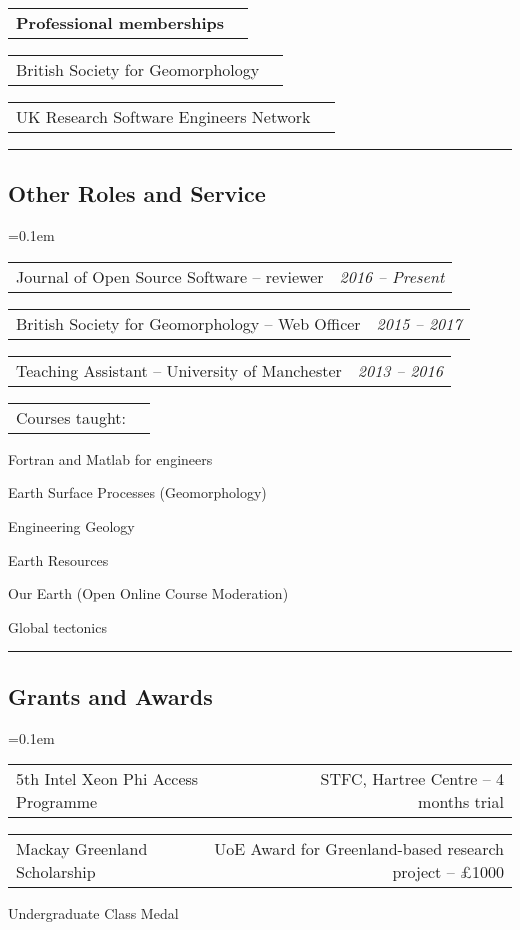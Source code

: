 \documentclass[10.5pt,a4]{article}
\makeatletter
\newenvironment{indentsection}[1]%
{\begin{list}{}%
	{\setlength{\leftmargin}{#1}}%
	\item[]%
}
{\end{list}}
\newcommand{\headerrow}[2]
{\begin{tabular*}{\linewidth}{l@{\extracolsep{\fill}}r}
	#1 &
	#2 \\
\end{tabular*}}
\makeatother
\begin{document}
\begin{itemize*}
	\item 
	\headerrow
		{\textbf{Professional memberships}}
		{}
	\headerrow {British Society for Geomorphology}{}
	\headerrow {UK Research Software Engineers Network}{}

\end{itemize*}

\hrule
\vspace{-0.4em}
\subsection*{Other Roles and Service} 
	\parskip=0.1em
\begin{itemize*}
	\item
	\headerrow
		 {Journal of Open Source Software -- reviewer}
		 {\textit{2016 -- Present}}
	\item 
	\headerrow 
	  {British Society for Geomorphology -- Web Officer}
	  {\textit{2015 -- 2017}}
	\item
	\headerrow
		 {Teaching Assistant -- University of Manchester}
		 {\textit{2013 -- 2016}}
  \headerrow
      {Courses taught:}
      {}
		\begin{itemize*}
		\item Fortran and Matlab for engineers
    \item Earth Surface Processes (Geomorphology)
    \item Engineering Geology
    \item Earth Resources
    \item Our Earth (Open Online Course Moderation)
		\item Global tectonics
			\end{itemize*}
\end{itemize*}

\hrule
\vspace{-0.4em}
\subsection*{Grants and Awards}
	\parskip=0.1em
\begin{itemize*}

	\item 
	\headerrow 
	  {5th Intel Xeon Phi Access Programme}
	  {STFC, Hartree Centre -- 4 months trial}

	\item
	\headerrow
		 {Mackay Greenland Scholarship}
		 {UoE Award for Greenland-based research project -- £1000}
	\item Undergraduate Class Medal


\end{itemize*}


%
%
%
%
\end{document}
